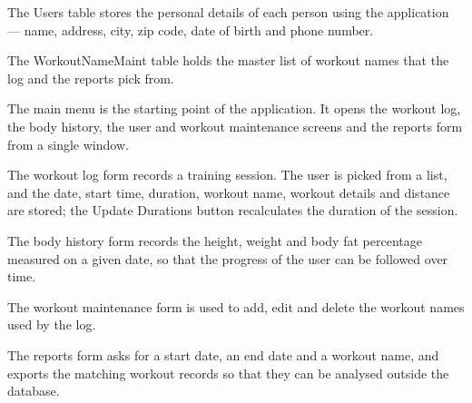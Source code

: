 {\small The Users table stores the personal details of each person using the
application --- name, address, city, zip code, date of birth and phone number.}
\vspace{4pt}


\clearpage
{}
{\small The WorkoutNameMaint table holds the master list of workout names that
the log and the reports pick from.}
\vspace{4pt}


\vspace{6pt}

{\small The main menu is the starting point of the application. It opens the
workout log, the body history, the user and workout maintenance screens and the
reports form from a single window.}
\vspace{4pt}


\clearpage
{}
{\small The workout log form records a training session. The user is picked
from a list, and the date, start time, duration, workout name, workout details
and distance are stored; the Update Durations button recalculates the duration
of the session.}
\vspace{4pt}


{\small The body history form records the height, weight and body fat percentage
measured on a given date, so that the progress of the user can be followed over
time.}
\vspace{4pt}


\clearpage
{}
{\small The workout maintenance form is used to add, edit and delete the workout
names used by the log.}
\vspace{4pt}


\vspace{2pt}

{\small The reports form asks for a start date, an end date and a workout name,
and exports the matching workout records so that they can be analysed outside
the database.}
\vspace{4pt}



